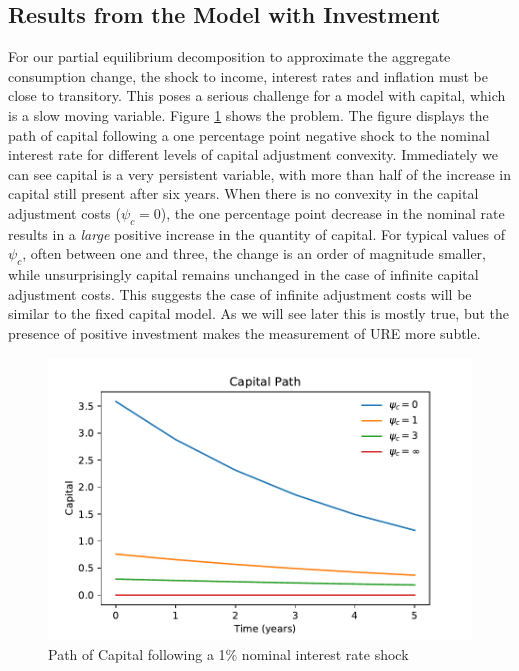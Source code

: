 \documentclass[titlepage]{\econtex}\newcommand{\texname}{ConsumptionHeterogeneity}
\begin{document}
\subsection{Results from the Model with Investment}
For our partial equilibrium decomposition to approximate the aggregate consumption change, the shock to income, interest rates and inflation must be close to transitory. This poses a serious challenge for a model with capital, which is a slow moving variable. Figure \ref{fig:PathCap} shows the problem. The figure displays the path of capital following a one percentage point negative shock to the nominal interest rate for different levels of capital adjustment convexity. Immediately we can see capital is a very persistent variable, with more than half of the increase in capital still present after six years. When there is no convexity in the capital adjustment costs ($\psi_c = 0$), the one percentage point decrease in the nominal rate results in a \textit{large} positive increase in the quantity of capital. For typical values of $\psi_c$, often between one and three, the change is an order of magnitude smaller, while unsurprisingly capital remains unchanged in the case of infinite capital adjustment costs. This suggests the case of infinite adjustment costs will be similar to the fixed capital model. As we will see later this is mostly true, but the presence of positive investment makes the measurement of URE more subtle.

\begin{figure} 
	\begin{centering}
		\includegraphics[scale=0.7]{../Python/DoloCode/Figures/TANK_capital_IRF_k.pdf}
		\caption{Path of Capital following a 1\% nominal interest rate shock}
		\label{fig:PathCap}
	\end{centering}
\end{figure}
\end{document}

